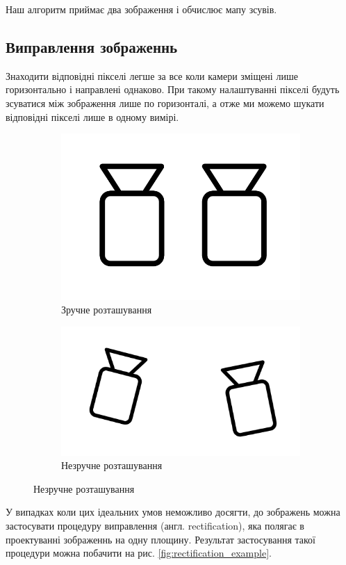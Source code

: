 \documentclass{article}
\theoremstyle{definition}
\begin{document}
Наш алгоритм приймає два зображення і обчислює мапу зсувів.

\subsection{Виправлення зображеннь}
Знаходити відповідні пікселі легше за все коли камери зміщені лише горизонтально і направлені однаково. При такому налаштуванні пікселі будуть зсуватися між зображення лише по горизонталі, а отже ми можемо шукати відповідні пікселі лише в одному вимірі.

\begin{figure}[h]
	\begin{subfigure}{.5\textwidth}
		\includegraphics[width=0.6\linewidth]{cameras_conveniently_placed}
		\centering
		\caption{Зручне розташування}
	\end{subfigure}
	\begin{subfigure}{.5\textwidth}
		\includegraphics[width=0.9\linewidth]{cameras_inconveniently_placed}
		\centering
		\caption{Незручне розташування}
	\end{subfigure}
	\centering
	\label{fig:camera_positions}
\end{figure}

У випадках коли цих ідеальних умов неможливо досягти, до зображень можна застосувати процедуру виправлення (англ. rectification), яка полягає в проектуванні зображеннь на одну площину. Результат застосування такої процедури можна побачити на рис. \ref{fig:rectification_example}.
\end{document}
